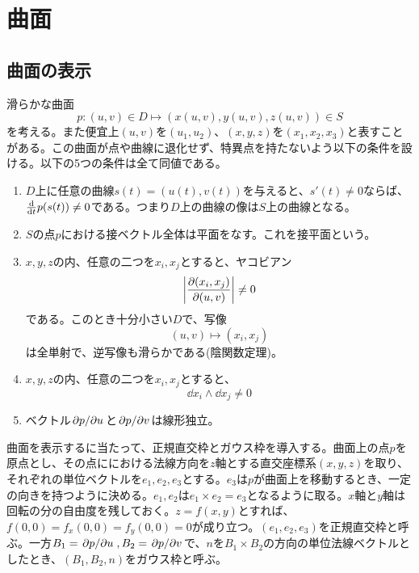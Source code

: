 \section{曲面}

\subsection{曲面の表示}
    滑らかな曲面
        \[p: (u, v) \in D \mapsto (x(u, v), y(u, v), z(u, v)) \in S\]
    を考える。また便宜上$(u, v)$を$(u_1, u_2)$、$(x, y, z)$を$(x_1, x_2, x_3)$と表すことがある。この曲面が点や曲線に退化せず、特異点を持たないよう以下の条件を設ける。以下の5つの条件は全て同値である。
    \begin{enumerate}
        \item $D$上に任意の曲線$s(t) = (u(t), v(t))$を与えると、$s'(t) \neq 0$ならば、$\dv{t}p(s(t)) \neq 0$である。つまり$D$上の曲線の像は$S$上の曲線となる。
        \item $S$の点$p$における接ベクトル全体は平面をなす。これを接平面という。
        \item $x, y, z$の内、任意の二つを$x_i, x_j$とすると、ヤコビアン
                \[\left|\pdv{(x_i, x_j)}{(u, v)}\right| \neq 0\]
            である。このとき十分小さい$D$で、写像
                  \[(u, v) \mapsto (x_i, x_j)\]
              は全単射で、逆写像も滑らかである(陰関数定理)。
        \item $x, y, z$の内、任意の二つを$x_i, x_j$とすると、
                  \[\dd{x_i} \wedge \dd{x_j} \neq 0\]
        \item ベクトル$\pdv*{p}{u}$と$\pdv*{p}{v}$は線形独立。
    \end{enumerate}
    曲面を表示するに当たって、正規直交枠とガウス枠を導入する。曲面上の点$p$を原点とし、その点ににおける法線方向を$z$軸とする直交座標系$(x, y, z)$を取り、それぞれの単位ベクトルを$e_1, e_2, e_3$とする。$e_3$は$p$が曲面上を移動するとき、一定の向きを持つように決める。$e_1, e_2$は$e_1 \times e_2 = e_3$となるように取る。$x$軸と$y$軸は回転の分の自由度を残しておく。$z = f(x, y)$とすれば、$f(0, 0) = f_x(0, 0) = f_y(0, 0) = 0$が成り立つ。$(e_1, e_2, e_3)$を正規直交枠と呼ぶ。一方$B_1 = \pdv*{p}{u}, B_2 = \pdv*{p}{v}$で、$n$を$B_1 \times B_2$の方向の単位法線ベクトルとしたとき、$(B_1, B_2, n)$をガウス枠と呼ぶ。


